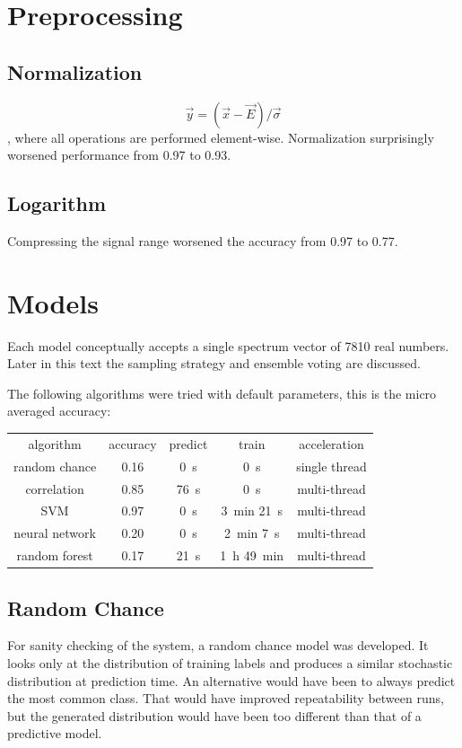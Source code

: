 \documentclass{article}
\begin{document}
\section{Preprocessing}
\subsection{Normalization}
$$ \vec{y} = (\vec{x} - \vec{E}) / \vec{\sigma} $$
, where all operations are performed element-wise.
Normalization surprisingly worsened performance from 0.97 to 0.93.


\subsection{Logarithm}
Compressing the signal range worsened the accuracy from 0.97 to 0.77.


\section{Models}
Each model conceptually accepts a single spectrum vector of 7810 real numbers.
Later in this text the sampling strategy and ensemble voting are discussed.
\par
The following algorithms were tried with default parameters, this is the micro averaged accuracy:
\\ \par
{}
\begin{tabular}{ c | c | c | c | c }
algorithm      & accuracy                & predict          & train                            & acceleration \\
random chance  & 0.16                    & \SI{0}{\second}  & \SI{0}{\second}                  & single thread \\
correlation    & 0.85                    & \SI{76}{\second} & \SI{0}{\second}                  & multi-thread \\
SVM            & 0.97                    & \SI{0}{\second}  & \SI{3}{\minute} \SI{21}{\second} & multi-thread \\
neural network & 0.20                    & \SI{0}{\second}  & \SI{2}{\minute} \SI{7}{\second}  & multi-thread \\
random forest  & 0.17                    & \SI{21}{\second} & \SI{1}{\hour} \SI{49}{\minute}   & multi-thread \\
\end{tabular}


\subsection{Random Chance}
For sanity checking of the system, a random chance model was developed.
It looks only at the distribution of training labels and produces a similar stochastic distribution at prediction time.
An alternative would have been to always predict the most common class.
That would have improved repeatability between runs, but the generated distribution would have been too different than that of a predictive model.
\end{document}
